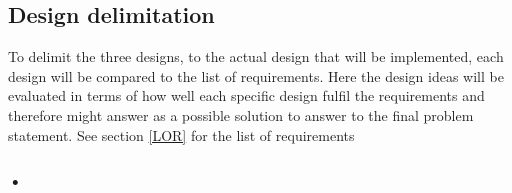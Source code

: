 \subsection{Design delimitation}

To delimit the three designs, to the actual design that will be implemented, each design will be compared to the list of requirements. Here the design ideas will be evaluated in terms of how well each specific design fulfil the requirements and therefore might answer as a possible solution to answer to the final problem statement. See section \ref{LOR} for the list of requirements

\subsubsection{•}